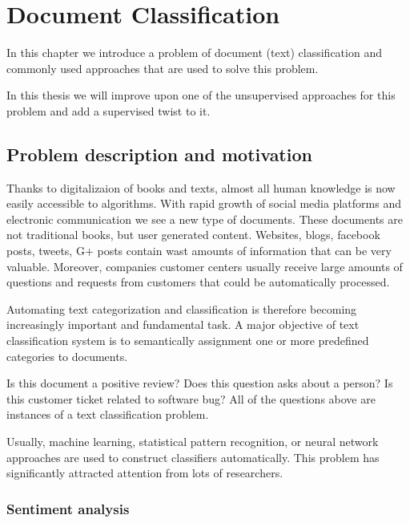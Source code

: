 \chapter{Document Classification}

    In this chapter we introduce a problem of document (text) classification and commonly used approaches that are used to solve this problem.
    
    In this thesis we will improve upon one of the unsupervised approaches for this problem and add a supervised twist to it.

\section{Problem description and motivation} \label{sec:problem}

    Thanks to digitalizaion of books and texts, almost all human knowledge is now easily accessible to algorithms. 
    With rapid growth of social media platforms and electronic communication we see a new type of documents.
    These documents are not traditional books, but user generated content.
    Websites, blogs, facebook posts, tweets, G+ posts contain wast amounts of information that can be very valuable.
    Moreover, companies customer centers usually receive large amounts of questions and requests from customers that could be automatically processed.
    
    Automating text categorization and classification is therefore becoming increasingly important and fundamental task. 
    A major objective of text classification system is to semantically assignment one or more predefined categories to documents.
    
    Is this document a positive review? 
    Does this question asks about a person?
    Is this customer ticket related to software bug?
    All of the questions above are instances of a text classification problem.
    
    Usually, machine learning, statistical pattern recognition, or neural network approaches are used to construct classifiers automatically.
    This problem has significantly attracted attention from lots of researchers.

    \subsection{Sentiment analysis}
    
    \* %
    
